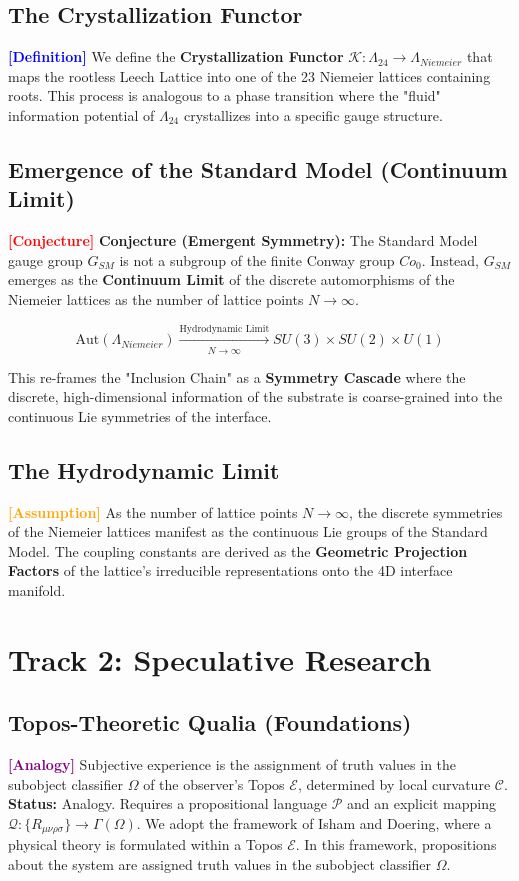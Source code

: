 \documentclass[11pt,titlepage]{article}
\newcommand{\leech}{\Lambda_{24}}
\newcommand{\curvature}{\mathcal{C}}
\newcommand{\topos}{\mathcal{E}}
\newcommand{\classifier}{\Omega}
\newcommand{\tagdef}{\textcolor{blue}{\textbf{[Definition]}} }
\newcommand{\tagass}{\textcolor{orange}{\textbf{[Assumption]}} }
\newcommand{\tagconj}{\textcolor{red}{\textbf{[Conjecture]}} }
\newcommand{\taganal}{\textcolor{purple}{\textbf{[Analogy]}} }
\begin{document}
\subsection{The Crystallization Functor}
\tagdef We define the \textbf{Crystallization Functor} $\mathcal{K}: \leech \to \Lambda_{Niemeier}$ that maps the rootless Leech Lattice into one of the 23 Niemeier lattices containing roots. This process is analogous to a phase transition where the "fluid" information potential of $\leech$ crystallizes into a specific gauge structure.


\subsection{Emergence of the Standard Model (Continuum Limit)}
\tagconj \textbf{Conjecture (Emergent Symmetry):} The Standard Model gauge group $G_{SM}$ is not a subgroup of the finite Conway group $Co_0$. Instead, $G_{SM}$ emerges as the \textbf{Continuum Limit} of the discrete automorphisms of the Niemeier lattices as the number of lattice points $N \to \infty$.

\begin{equation}
\text{Aut}(\Lambda_{Niemeier}) \xrightarrow[N \to \infty]{\text{Hydrodynamic Limit}} SU(3) \times SU(2) \times U(1)
\end{equation}

This re-frames the "Inclusion Chain" as a \textbf{Symmetry Cascade} where the discrete, high-dimensional information of the substrate is coarse-grained into the continuous Lie symmetries of the interface.


\subsection{The Hydrodynamic Limit}
\tagass As the number of lattice points $N \to \infty$, the discrete symmetries of the Niemeier lattices manifest as the continuous Lie groups of the Standard Model. The coupling constants are derived as the \textbf{Geometric Projection Factors} of the lattice's irreducible representations onto the 4D interface manifold.

\section{Track 2: Speculative Research}

\subsection{Topos-Theoretic Qualia (Foundations)}
\taganal Subjective experience is the assignment of truth values in the subobject classifier $\classifier$ of the observer's Topos $\topos$, determined by local curvature $\curvature$.
\textbf{Status:} Analogy. Requires a propositional language $\mathcal{P}$ and an explicit mapping $\mathcal{Q}: \{R_{\mu\nu\rho\sigma}\} \to \Gamma(\Omega)$. We adopt the framework of Isham and Doering, where a physical theory is formulated within a Topos $\topos$. In this framework, propositions about the system are assigned truth values in the subobject classifier $\classifier$.
\end{document}
